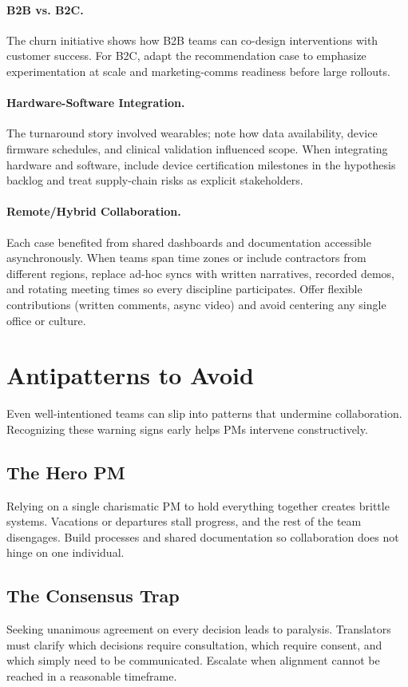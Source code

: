 \paragraph{B2B vs. B2C.} The churn initiative shows how B2B teams can co-design interventions with customer success. For B2C, adapt the recommendation case to emphasize experimentation at scale and marketing-comms readiness before large rollouts.

\paragraph{Hardware-Software Integration.} The turnaround story involved wearables; note how data availability, device firmware schedules, and clinical validation influenced scope. When integrating hardware and software, include device certification milestones in the hypothesis backlog and treat supply-chain risks as explicit stakeholders.

\paragraph{Remote/Hybrid Collaboration.} Each case benefited from shared dashboards and documentation accessible asynchronously. When teams span time zones or include contractors from different regions, replace ad-hoc syncs with written narratives, recorded demos, and rotating meeting times so every discipline participates. Offer flexible contributions (written comments, async video) and avoid centering any single office or culture.

\section{Antipatterns to Avoid}
\label{sec:antipatterns}

Even well-intentioned teams can slip into patterns that undermine collaboration. Recognizing these warning signs early helps PMs intervene constructively.

\subsection{The Hero PM}
Relying on a single charismatic PM to hold everything together creates brittle systems. Vacations or departures stall progress, and the rest of the team disengages. Build processes and shared documentation so collaboration does not hinge on one individual.

\subsection{The Consensus Trap}
Seeking unanimous agreement on every decision leads to paralysis. Translators must clarify which decisions require consultation, which require consent, and which simply need to be communicated. Escalate when alignment cannot be reached in a reasonable timeframe.

